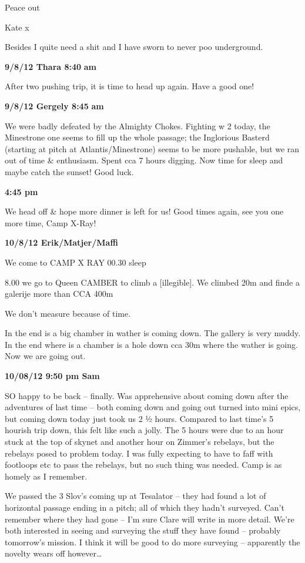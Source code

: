 Peace out

Kate x

Besides I quite need a shit and I have sworn to never poo underground.

\textbf{9/8/12 Thara 8:40} \textbf{am}

After two pushing trip, it is time to head up again. Have a good one!

\textbf{9/8/12 Gergely 8:45} \textbf{am}

We were badly defeated by the Almighty Chokes. Fighting w 2 today, the
Minestrone one seems to fill up the whole passage; the Inglorious
Basterd (starting at pitch at Atlantis/Minestrone) seems to be more
pushable, but we ran out of time \& enthusiasm. Spent cca 7 hours
digging. Now time for sleep and maybe catch the sunset! Good luck.

\textbf{4:45 pm}

We head off \& hope more dinner is left for us! Good times again, see
you one more time, Camp X-Ray!

\textbf{10/8/12 Erik/Matjer/Maffi}

We come to CAMP X RAY 00.30 sleep

8.00 we go to Queen CAMBER to climb a {[}illegible{]}. We climbed 20m
and finde a galerije more than CCA 400m

We don't measure because of time.

In the end is a big chamber in wather is coming down. The gallery is
very muddy. In the end where is a chamber is a hole down cca 30m where
the wather is going. Now we are going out.

\textbf{10/08/12 9:50 pm Sam}

SO happy to be back -- finally. Was apprehensive about coming down after
the adventures of last time -- both coming down and going out turned
into mini epics, but coming down today just took us 2 ½ hours. Compared
to last time's 5 hourish trip down, this felt like such a jolly. The 5
hours were due to an hour stuck at the top of skynet and another hour on
Zimmer's rebelays, but the rebelays posed to problem today. I was fully
expecting to have to faff with footloops etc to pass the rebelays, but
no such thing was needed. Camp is as homely as I remember.

We passed the 3 Slov's coming up at Tesalator -- they had found a lot of
horizontal passage ending in a pitch; all of which they hadn't surveyed.
Can't remember where they had gone -- I'm sure Clare will write in more
detail. We're both interested in seeing and surveying the stuff they
have found -- probably tomorrow's mission. I think it will be good to do
more surveying -- apparently the novelty wears off however\ldots{}


